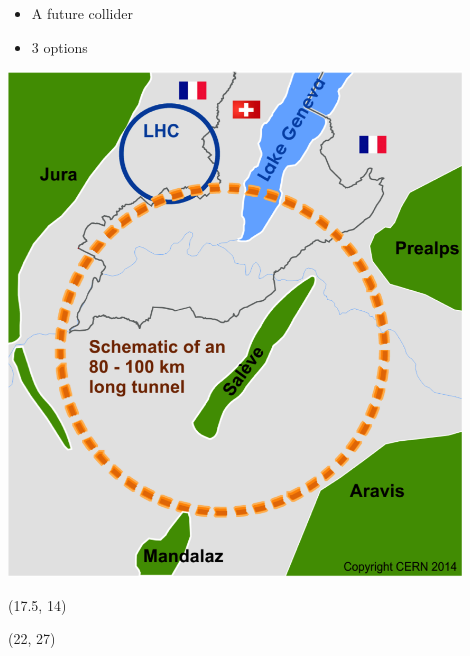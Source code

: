 \documentclass[final,xcolor={dvipsnames,svgnames,x11names,table}]{beamer}
\begin{document}
\begin{frame}
\begin{textblock}{16.5}
\begin{tcolorbox}[title=FCC: Future Circular Collider]
  \begin{itemize}
    \item A future collider
    \item 3 options
  \end{itemize}
    \centering
    \includegraphics[width=0.9\textwidth]{Figures/cernFCC}

  \end{tcolorbox}
\end{textblock}
%
\begin{textblock}{52}(17.5, 14)
  \begin{tcolorbox}[title=FCCSW: Physics and Detector simulations with FCCSW]

  \centering

  \end{tcolorbox}
\end{textblock}
\begin{textblock}{36.8}(22, 27)
  \begin{tcolorbox}[title=The IDEA detector concept]


\end{tcolorbox}
\end{textblock}
\end{frame}
\end{document}
